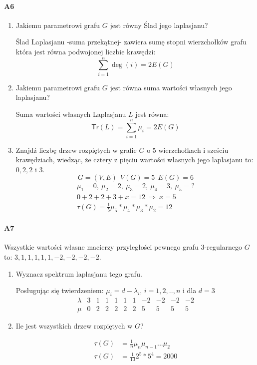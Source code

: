 \paragraph{A6}
\begin{enumerate}[label=\alph*)]
\item Jakiemu parametrowi grafu $G$ jest równy Ślad jego laplasjanu?

Ślad Laplasjanu -suma przekątnej- zawiera sumę stopni wierzchołków grafu która jest równa podwojonej liczbie krawędzi: $$\sum _{i=1}^n\deg (i)=2E(G)$$ 
\item Jakiemu parametrowi grafu $G$ jest równa suma wartości własnych jego laplasjanu?

Suma wartości własnych Laplasjanu $L$ jest równa:
$$\mathsf{Tr}(L)=\sum _{i=1}^n \mu _i=2E(G)$$
\item Znajdź liczbę drzew rozpiętych w grafie $G$ o $5$ wierzchołkach i sześciu krawędziach, wiedząc, że cztery z pięciu wartości własnych jego laplasjanu to: $0, 2, 2$ i $3$.
$$G=(V,E)\ \ V(G)=5\ \ E(G)=6$$
\begin{align*}
\mu _1=0,\ \mu _2=2,\ \mu _3=2,\ \mu _4=3,\ \mu _5=?\\
0+2+2+3+x=12\ \Rightarrow \ x=5\\
\tau (G)=\frac{1}{5}\mu _5*\mu _4*\mu_3*\mu_2 = 12
\end{align*}
\end{enumerate}

\paragraph{A7} Wszystkie wartości własne macierzy przyległości pewnego grafu $3$-regularnego $G$ to: $3, 1, 1, 1, 1, 1, -2,-2,-2,-2$.
\begin{enumerate}[label=\alph*)]
\item Wyznacz spektrum laplasjanu tego grafu.

Posługując się twierdzeniem: $\mu _i=d-\lambda _i,\, i=1,2,..,n$ i dla $d=3$
$$\begin{array}{l|cccccccccc}
\lambda & 3& 1& 1& 1& 1& 1& -2&-2&-2&-2\\\hline
\mu & 0&2&2&2&2&2&5&5&5&5
\end{array}$$
\item Ile jest wszystkich drzew rozpiętych w $G$?

\begin{align*}
\tau (G)&=\frac{1}{n}\mu_n \mu_{n-1}...\mu _2\\
\tau (G)&=\frac{1}{10}2^5*5^4=2000
\end{align*}
\end{enumerate}
 
